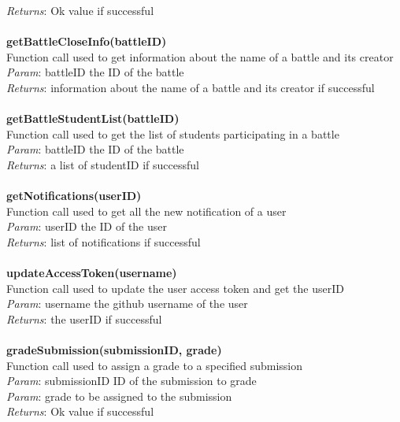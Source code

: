 \documentclass{article}
\begin{document}
\textit{Returns}: Ok value if successful\\
\\
\textbf{getBattleCloseInfo(battleID)}\\
Function call used to get information about the name of a battle and its creator\\
\textit{Param}: battleID the ID of the battle\\
\textit{Returns}: information about the name of a battle and its creator if successful\\
\\
\textbf{getBattleStudentList(battleID)}\\
Function call used to get the list of students participating in a battle\\
\textit{Param}: battleID the ID of the battle\\
\textit{Returns}: a list of studentID if successful\\
\\
\textbf{getNotifications(userID)}\\
Function call used to get all the new notification of a user\\
\textit{Param}: userID the ID of the user\\
\textit{Returns}: list of notifications if successful\\
\\
\textbf{updateAccessToken(username)}\\
Function call used to update the user access token and get the userID\\
\textit{Param}: username the github username of the user\\
\textit{Returns}: the userID if successful\\
\\
\textbf{gradeSubmission(submissionID, grade)}\\
Function call used to assign a grade to a specified submission\\
\textit{Param}: submissionID ID of the submission to grade\\
\textit{Param}: grade to be assigned to the submission\\
\textit{Returns}: Ok value if successful\\
\end{document}
